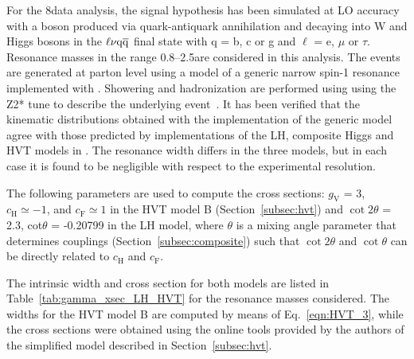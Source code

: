 For the 8\TeV data analysis, the signal hypothesis has been simulated at LO accuracy with a \Wpr boson produced via quark-antiquark annihilation and decaying into W and Higgs bosons
in the $\ell\nu\mathrm{q}\overline{\mathrm{q}}$ final state with q = b, c or g and $\ell$ = e, $\mu$ or $\tau$. Resonance masses in the range 0.8--2.5\TeV are considered in this analysis.
The events are generated at parton level using a model of a generic narrow spin-1 \Wpr resonance implemented with \MADGRAPH{}.
Showering and hadronization are performed using  using the Z2* tune to describe the underlying event~\cite{Chatrchyan:2011id,Chatrchyan:2013gfi}.
It has been verified that the kinematic distributions obtained with the implementation of the generic model 
agree with those predicted by implementations of the LH, composite Higgs and HVT models in \MADGRAPH{}.
The resonance width differs in the three models, but in each case it is found to be negligible with respect to the experimental resolution.

The following parameters are used to compute the cross sections: $g_\mathrm{V}$ = 3, $c_\mathrm{H} \simeq -1$, and $c_\mathrm{F} \simeq 1$
in the HVT model B (Section~\ref{subsec:hvt}) and $\cot 2 \theta$ = 2.3, cot$\theta$ = -0.20799 in the LH model, where $\theta$ is a mixing
angle parameter that determines \Wpr couplings (Section~\ref{subsec:composite}) such that $\cot 2 \theta$ and $\cot\theta$ can be directly related to $c_\mathrm{H}$ and $c_\mathrm{F}$.

The intrinsic width and cross section for both models are listed in Table~\ref{tab:gamma_xsec_LH_HVT} for the resonance masses considered.
The widths for the HVT model B are computed by means of Eq.~\ref{eqn:HVT_3},
while the cross sections were obtained using the online tools provided by the authors of the simplified model described in Section~\ref{subsec:hvt}.

